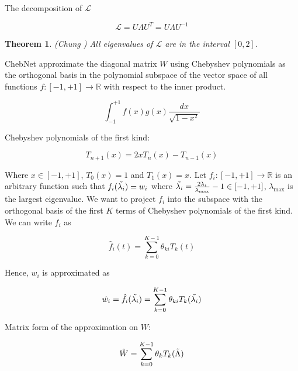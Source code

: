 \documentclass{article}
\newtheorem{theorem}{Theorem}
\begin{document}
The decomposition of $\mathcal{L}$

\begin{equation}
    \mathcal{L} = U \Lambda U^T = U \Lambda U^{-1}
\end{equation}

\begin{theorem}(Chung \cite{chung1997spectral})
All eigenvalues of $\mathcal{L}$ are in the interval $[0, 2]$.
\end{theorem}

ChebNet \cite{defferrard2016convolutional} approximate the diagonal matrix $W$ using Chebyshev polynomials as the orthogonal basis in the polynomial subspace of the vector space of all functions $f: [-1, +1] \to \mathbb{R}$ with respect to the inner product.

\begin{equation}
    \int_{-1}^{+1} f(x) g(x) \frac{dx}{\sqrt{1-x^2}}
\end{equation}

Chebyshev polynomials of the first kind:

\begin{equation}
    T_{n+1}(x) = 2x T_n(x) - T_{n-1}(x)
\end{equation}

Where $x \in [-1, +1]$, $T_0(x) = 1$ and $T_1(x) = x$. Let $f_i: [-1, +1] \to \mathbb{R}$ is an arbitrary function such that $f_i(\Tilde{\lambda_i}) = w_i$ where $\Tilde{\lambda_i} = \frac{2 \lambda_i}{\lambda_{\max}} - 1 \in [-1, +1]$, $\lambda_{\max}$ is the largest eigenvalue. We want to project $f_i$ into the subspace with the orthogonal basis of the first $K$ terms of Chebyshev polynomials of the first kind. We can write $f_i$ as

\begin{equation}
    \hat{f}_i(t) = \sum_{k=0}^{K-1} \theta_{k i} T_k(t)
\end{equation}

Hence, $w_i$ is approximated as

\begin{equation}
    \hat{w_i} = \hat{f}_i(\Tilde{\lambda_i}) = \sum_{k=0}^{K-1} \theta_{k i} T_k(\Tilde{\lambda_i})
\end{equation}

Matrix form of the approximation on $W$:

\begin{equation}
    \hat{W} = \sum_{k=0}^{K-1} \theta_k T_k(\Tilde{\Lambda})
\end{equation}
\end{document}
